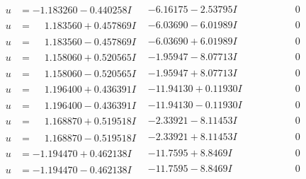 \documentclass[1p]{elsarticle_modified}
\theoremstyle{definition}
\begin{document}
$$\begin{array}{c|c|c}
\begin{aligned}
u &= -1.183260 - 0.440258 I\end{aligned}
 & -6.16175 - 2.53795 I & \phantom{-0.000000 } 0 \\ \hline\begin{aligned}
u &= \phantom{-}1.183560 + 0.457869 I\end{aligned}
 & -6.03690 - 6.01989 I & \phantom{-0.000000 } 0 \\ \hline\begin{aligned}
u &= \phantom{-}1.183560 - 0.457869 I\end{aligned}
 & -6.03690 + 6.01989 I & \phantom{-0.000000 } 0 \\ \hline\begin{aligned}
u &= \phantom{-}1.158060 + 0.520565 I\end{aligned}
 & -1.95947 - 8.07713 I & \phantom{-0.000000 } 0 \\ \hline\begin{aligned}
u &= \phantom{-}1.158060 - 0.520565 I\end{aligned}
 & -1.95947 + 8.07713 I & \phantom{-0.000000 } 0 \\ \hline\begin{aligned}
u &= \phantom{-}1.196400 + 0.436391 I\end{aligned}
 & -11.94130 + 0.11930 I & \phantom{-0.000000 } 0 \\ \hline\begin{aligned}
u &= \phantom{-}1.196400 - 0.436391 I\end{aligned}
 & -11.94130 - 0.11930 I & \phantom{-0.000000 } 0 \\ \hline\begin{aligned}
u &= \phantom{-}1.168870 + 0.519518 I\end{aligned}
 & -2.33921 - 8.11453 I & \phantom{-0.000000 } 0 \\ \hline\begin{aligned}
u &= \phantom{-}1.168870 - 0.519518 I\end{aligned}
 & -2.33921 + 8.11453 I & \phantom{-0.000000 } 0 \\ \hline\begin{aligned}
u &= -1.194470 + 0.462138 I\end{aligned}
 & -11.7595 + 8.8469 I & \phantom{-0.000000 } 0 \\ \hline\begin{aligned}
u &= -1.194470 - 0.462138 I\end{aligned}
 & -11.7595 - 8.8469 I & \phantom{-0.000000 } 0 \\ \hline\begin{aligned}

\end{aligned}
\end{array}$$
\end{document}
